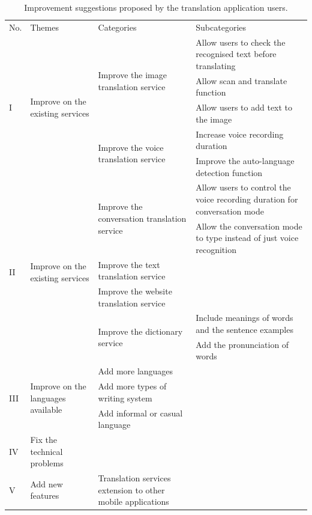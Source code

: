 \documentclass[english]{textolivre}
\begin{document}
\begin{longtable}{p{1cm} p{2.5cm} p{4.5cm} p{5cm}}
\caption{Improvement suggestions proposed by the translation application users.}
\label{tbl3}
\footnotesize
\\
\toprule
No. & Themes & Categories & Subcategories \\ 
\midrule
\multirow{5}{=}{I} & \multirow{5}{=}{Improve on the existing services} & \multirow{3}{=}{Improve the image translation service} & Allow users to check the recognised text before translating \\
& & & Allow scan and translate function \\
& & & Allow users to add text to the image \\
\cmidrule{3-4}
& & \multirow{2}{=}{Improve the voice translation service} & Increase voice recording duration \\
& & & Improve the auto-language detection function \\
\midrule
\multirow{6}{=}{II} & \multirow{6}{=}{Improve on the existing services} & \multirow{2}{=}{Improve the conversation translation service} & Allow users to control the voice recording duration for conversation mode \\
& & & Allow the conversation mode to type instead of just voice recognition \\
\cmidrule{3-4}
& & Improve the text translation service & \cellcolor[HTML]{EFEFEF} \\
\cmidrule{3-4}
& & Improve the website translation service & \cellcolor[HTML]{EFEFEF} \\
\cmidrule{3-4}
& & \multirow{2}{=}{Improve the dictionary service} & Include meanings of words and the sentence examples \\
& & & Add the pronunciation of words \\
\midrule
\multirow{3}{=}{III} & \multirow{3}{=}{Improve on the languages available} & Add more languages & \cellcolor[HTML]{EFEFEF} \\
\cmidrule{3-4}
& & Add more types of writing system & \cellcolor[HTML]{EFEFEF} \\
\cmidrule{3-4}
& & Add informal or casual language & \cellcolor[HTML]{EFEFEF} \\
\midrule
IV & Fix the technical problems & \cellcolor[HTML]{EFEFEF} & \cellcolor[HTML]{EFEFEF} \\
\midrule
\multirow{7}{=}{V} & \multirow{7}{=}{Add new features} & Translation services extension to other mobile applications & \cellcolor[HTML]{EFEFEF} \\

\end{longtable}
\end{document}

